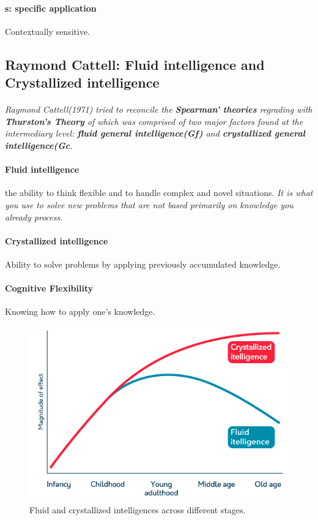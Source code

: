 \documentclass{article}
\begin{document}
	\paragraph{s: specific application} Contextually sensitive.
	\subsection{Raymond Cattell: Fluid intelligence and Crystallized intelligence}
	\paragraph{} \emph{Raymond Cattell(1971) tried to reconcile the \textbf{Spearman' theories} regrading  with \textbf{Thurston's Theory} of  which was comprised of two major factors found at the intermediary level: \textbf{fluid general intelligence(Gf)} and \textbf{crystallized general intelligence(Gc}.}
	\paragraph{Fluid intelligence} the ability to think flexible and to handle complex and novel situations. \emph{It is what you use to solve new problems that are not based primarily on knowledge you already process.}
	\paragraph{Crystallized intelligence} Ability to solve problems by applying previously accumulated knowledge.
	\paragraph{Cognitive Flexibility} Knowing how to apply one's knowledge.
	\begin{figure}
		\centering
		\includegraphics[width = \linewidth]{pic/fluid_and_crystallized_intelligences_over_ages}
		\caption{Fluid and crystallized intelligences across different stages.}	
	\end{figure}
\end{document}
